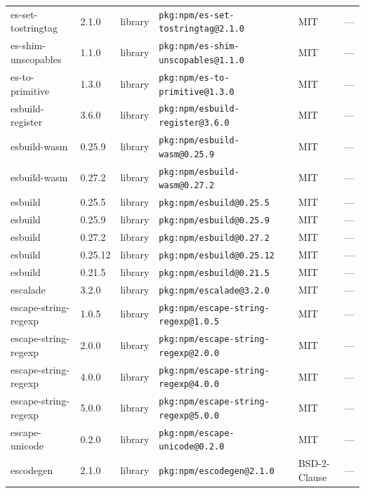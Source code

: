 \documentclass[11pt,a4paper]{article}
\begin{document}
\begin{longtable}{|p{4cm}|p{2cm}|p{1.6cm}|p{5cm}|p{1.5cm}|p{3.5cm}|}
\raggedright es-set-tostringtag & 2.1.0 & library & \small\texttt{pkg:npm/es-set-tostringtag@2.1.0} & MIT & \small — \\
\raggedright es-shim-unscopables & 1.1.0 & library & \small\texttt{pkg:npm/es-shim-unscopables@1.1.0} & MIT & \small — \\
\raggedright es-to-primitive & 1.3.0 & library & \small\texttt{pkg:npm/es-to-primitive@1.3.0} & MIT & \small — \\
\raggedright esbuild-register & 3.6.0 & library & \small\texttt{pkg:npm/esbuild-register@3.6.0} & MIT & \small — \\
\raggedright esbuild-wasm & 0.25.9 & library & \small\texttt{pkg:npm/esbuild-wasm@0.25.9} & MIT & \small — \\
\raggedright esbuild-wasm & 0.27.2 & library & \small\texttt{pkg:npm/esbuild-wasm@0.27.2} & MIT & \small — \\
\raggedright esbuild & 0.25.5 & library & \small\texttt{pkg:npm/esbuild@0.25.5} & MIT & \small — \\
\raggedright esbuild & 0.25.9 & library & \small\texttt{pkg:npm/esbuild@0.25.9} & MIT & \small — \\
\raggedright esbuild & 0.27.2 & library & \small\texttt{pkg:npm/esbuild@0.27.2} & MIT & \small — \\
\raggedright esbuild & 0.25.12 & library & \small\texttt{pkg:npm/esbuild@0.25.12} & MIT & \small — \\
\raggedright esbuild & 0.21.5 & library & \small\texttt{pkg:npm/esbuild@0.21.5} & MIT & \small — \\
\raggedright escalade & 3.2.0 & library & \small\texttt{pkg:npm/escalade@3.2.0} & MIT & \small — \\
\raggedright escape-string-regexp & 1.0.5 & library & \small\texttt{pkg:npm/escape-string-regexp@1.0.5} & MIT & \small — \\
\raggedright escape-string-regexp & 2.0.0 & library & \small\texttt{pkg:npm/escape-string-regexp@2.0.0} & MIT & \small — \\
\raggedright escape-string-regexp & 4.0.0 & library & \small\texttt{pkg:npm/escape-string-regexp@4.0.0} & MIT & \small — \\
\raggedright escape-string-regexp & 5.0.0 & library & \small\texttt{pkg:npm/escape-string-regexp@5.0.0} & MIT & \small — \\
\raggedright escape-unicode & 0.2.0 & library & \small\texttt{pkg:npm/escape-unicode@0.2.0} & MIT & \small — \\
\raggedright escodegen & 2.1.0 & library & \small\texttt{pkg:npm/escodegen@2.1.0} & BSD-2-Clause & \small — \\

\end{longtable}
\end{document}

